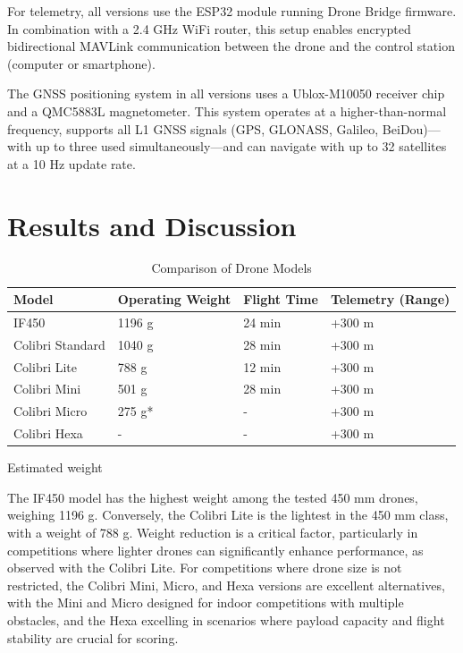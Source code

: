\documentclass[conference]{IEEEtran}
\begin{document}
For telemetry, all versions use the ESP32 module running Drone Bridge firmware. In combination with a 2.4 GHz WiFi router, this setup enables encrypted bidirectional MAVLink communication between the drone and the control station (computer or smartphone).

The GNSS positioning system in all versions uses a Ublox-M10050 receiver chip and a QMC5883L magnetometer. This system operates at a higher-than-normal frequency, supports all L1 GNSS signals (GPS, GLONASS, Galileo, BeiDou)—with up to three used simultaneously—and can navigate with up to 32 satellites at a 10 Hz update rate.

\section{Results and Discussion}

\begin{table}[htbp]
\centering
\caption{Comparison of Drone Models}
\label{tab:drone_comparison}
\begin{tabularx}{\columnwidth}{|l|X|X|X|}
\hline
\textbf{Model}         & \textbf{Operating Weight} & \textbf{Flight Time} & \textbf{Telemetry (Range)} \\ \hline
IF450                  & 1196 g                    & 24 min               & +300 m                     \\ \hline
Colibri Standard       & 1040 g                    & 28 min               & +300 m                     \\ \hline
Colibri Lite           & 788 g                     & 12 min               & +300 m                     \\ \hline
Colibri Mini           & 501 g                     & 28 min               & +300 m                     \\ \hline
Colibri Micro          & 275 g*                    & -                    & +300 m                     \\ \hline
Colibri Hexa           & -                         & -                    & +300 m                     \\ \hline
\end{tabularx}
\newline
\small *Estimated weight
\end{table}

The IF450 model has the highest weight among the tested 450 mm drones, weighing 1196 g. Conversely, the Colibri Lite is the lightest in the 450 mm class, with a weight of 788 g. Weight reduction is a critical factor, particularly in competitions where lighter drones can significantly enhance performance, as observed with the Colibri Lite. For competitions where drone size is not restricted, the Colibri Mini, Micro, and Hexa versions are excellent alternatives, with the Mini and Micro designed for indoor competitions with multiple obstacles, and the Hexa excelling in scenarios where payload capacity and flight stability are crucial for scoring.
\end{document}
